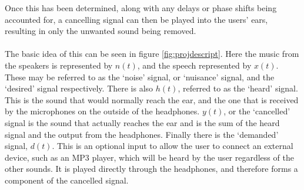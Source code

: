 Once this has been determined, along with any delays or phase shifts being accounted for, a cancelling signal can then be played into the users' ears, resulting in only the unwanted sound being removed.
\\
\\
The basic idea of this can be seen in figure \ref{fig:projdescript}.
Here the music from the speakers is represented by $n(t)$, and the speech represented by $x(t)$.
These may be referred to as the `noise' signal, or `nuisance' signal, and the `desired' signal respectively.
There is also $h(t)$, referred to as the `heard' signal.
This is the sound that would normally reach the ear, and the one that is received by the microphones on the outside of the headphones.
$y(t)$, or the `cancelled' signal is the sound that actually reaches the ear and is the sum of the heard signal and the output from the headphones.
Finally there is the `demanded' signal, $d(t)$.
This is an optional input to allow the user to connect an external device, such as an MP3 player, which will be heard by the user regardless of the other sounds.
It is played directly through the headphones, and therefore forms a component of the cancelled signal. 
